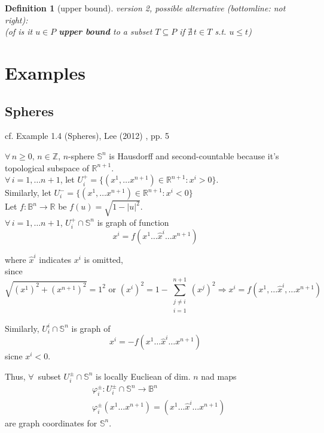\documentclass[10pt]{amsart}
\newtheorem{definition}{Definition}
\begin{document}
\begin{multicols*}{2}
\begin{definition}[upper bound]
version 2, possible alternative (bottomline: not right): \\
(of is it $u\in P$ \textbf{upper bound} to a subset $T \subseteq P$ if $\nexists \, t\in T$ s.t. $u\leq t$)

\end{definition}

\section{Examples}

\subsection{Spheres}

cf. Example 1.4 (Spheres), Lee (2012) \cite{JLee2012}, pp. 5

$\forall \, n \geq 0, \, n \in \mathbb{Z}$, $n$-sphere $\mathbb{S}^n$ is Hausdorff and second-countable because it's topological subspace of $\mathbb{R}^{n+1}$. \\
$\forall \, i = 1, \dots n +1$, let $U_i^+ = \lbrace (x^1, \dots x^{n+1}) \in \mathbb{R}^{n+1}: x^i > 0 \rbrace$. \\
Similarly, let $U_i^- = \lbrace (x^1, \dots x^{n+1})  \in \mathbb{R}^{n+1} : x^i < 0 \rbrace$  \\

Let $f: \mathbb{B}^n \to \mathbb{R}$ be $f(u) = \sqrt{ 1 - |u|^2}$. \\

$\forall \, i =1 , \dots n +1$, $U_i^+ \cap \mathbb{S}^n$ is graph of function
\[
x^i = f(x^1 \dots \widehat{x}^i \dots x^{n+1})
\]

where $\widehat{x}^i$ indicates $x^i$ is omitted, \\
since
\[
\sqrt{ (x^1)^2  + (x^{n+1})^2 } = 1^2 \text{ or } (x^i)^2 = 1 - \sum_{ \substack{ j\neq i \\ i =1} }^{n+1} (x^j)^2 \Longrightarrow x^i = f(x^1, \dots \widehat{x}^i, \dots x^{n+1})
\]

Similarly, $U_i^i \cap \mathbb{S}^n$ is graph of 
\[
x^i = -f(x^1 \dots \widehat{x}^i \dots x^{n+1})
\]
sicne $x^i < 0$.

Thus, $\forall \,$ subset $U_i^{\pm} \cap \mathbb{S}^n$ is locally Eucliean of dim. $n$ nad maps
\[
\begin{aligned}
	& \varphi_i^{\pm} : U_i^{\pm} \cap \mathbb{S}^n \to \mathbb{B}^n \\
	& \varphi_i^{\pm} (x^1 \dots x^{n+1}) = (x^1 \dots \widehat{x}^i \dots x^{n+1})
\end{aligned}
\]
are graph coordinates for $\mathbb{S}^n$.


\end{multicols*}
\end{document}
